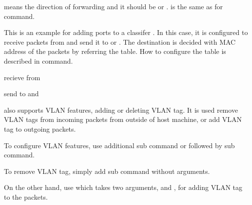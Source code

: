 \documentclass[a4paper,11pt,openany,oneside,english]{sphinxmanual}
\begin{document}
 means the direction of forwarding and it should be  or .
 is the same as for  command.

This is an example for adding ports to a classifer . In this case,
it is configured to receive packets from  and send it to 
or . The destination is decided with MAC address of the packets
by referring the table. How to configure the table is described in
{\hyperref[\detokenize{commands/secondary/spp_vf:commands-spp-vf-classifier-table}]{}} command.

\begin{sphinxVerbatim}[commandchars=\\\{\},formatcom=\footnotesize]
 recieve from 

 send to  and 
\end{sphinxVerbatim}

 also supports VLAN features, adding or deleting VLAN tag.
It is used remove VLAN tags from incoming packets from outside of host
machine, or add VLAN tag to outgoing packets.

To configure VLAN features, use additional sub command 
or  followed by  sub command.

To remove VLAN tag, simply add  sub command without arguments.

\begin{sphinxVerbatim}[commandchars=\\\{\},formatcom=\footnotesize]
\end{sphinxVerbatim}

On the other hand, use  which takes two arguments,
 and , for adding VLAN tag to the packets.
\end{document}
